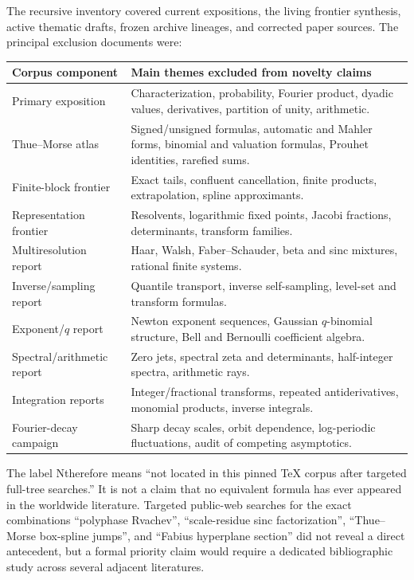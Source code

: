 \documentclass[11pt,oneside]{article}
\numberwithin{equation}{section}
\theoremstyle{definition}
\theoremstyle{remark}
\newcommand{\statusnew}{\textcolor{provedgreen}{\textsf{N}}}
\begin{document}
The recursive inventory covered current expositions, the living frontier
synthesis, active thematic drafts, frozen archive lineages, and corrected
paper sources.  The principal exclusion documents were:
\begin{center}
\small
\begin{tabularx}{0.96\textwidth}{@{}p{}X@{}}
\toprule
Corpus component & Main themes excluded from novelty claims\\
\midrule
Primary exposition & Characterization, probability, Fourier product, dyadic values, derivatives, partition of unity, arithmetic.\\
Thue--Morse atlas & Signed/unsigned formulas, automatic and Mahler forms, binomial and valuation formulas, Prouhet identities, rarefied sums.\\
Finite-block frontier & Exact tails, confluent cancellation, finite products, extrapolation, spline approximants.\\
Representation frontier & Resolvents, logarithmic fixed points, Jacobi fractions, determinants, transform families.\\
Multiresolution report & Haar, Walsh, Faber--Schauder, beta and sinc mixtures, rational finite systems.\\
Inverse/sampling report & Quantile transport, inverse self-sampling, level-set and transform formulas.\\
Exponent/$q$ report & Newton exponent sequences, Gaussian $q$-binomial structure, Bell and Bernoulli coefficient algebra.\\
Spectral/arithmetic report & Zero jets, spectral zeta and determinants, half-integer spectra, arithmetic rays.\\
Integration reports & Integer/fractional transforms, repeated antiderivatives, monomial products, inverse integrals.\\
Fourier-decay campaign & Sharp decay scales, orbit dependence, log-periodic fluctuations, audit of competing asymptotics.\\
\bottomrule
\end{tabularx}
\end{center}

The label \statusnew therefore means ``not located in this pinned TeX corpus
after targeted full-tree searches.''  It is not a claim that no equivalent
formula has ever appeared in the worldwide literature.  Targeted public-web
searches for the exact combinations ``polyphase Rvachev'', ``scale-residue sinc
factorization'', ``Thue--Morse box-spline jumps'', and ``Fabius hyperplane
section'' did not reveal a direct antecedent, but a formal priority claim would
require a dedicated bibliographic study across several adjacent literatures.
\end{document}
